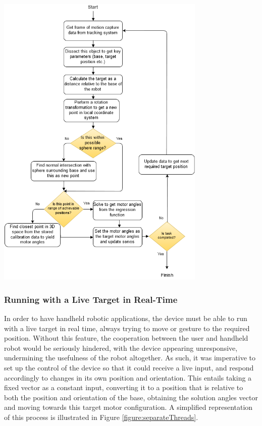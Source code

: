 \documentclass[11pt]{article}
\begin{document}
\begin{center}
\includegraphics[width=0.75\textwidth]{images/algorithmFlowDiagram.png}
\label{figure:getSolution}
\end{center}




\subsubsection{Running with a Live Target in Real-Time}
\label{section:liveTargetRealTime}

In order to have handheld robotic applications, the device must be able to run with a live target in real time, always trying to move or gesture to the required position. Without this feature, the cooperation between the user and handheld robot would be seriously hindered, with the device appearing unresponsive, undermining the usefulness of the robot altogether. As such, it was imperative to set up the control of the device so that it could receive a live input, and respond accordingly to changes in its own position and orientation. This entails taking a fixed vector as a constant input, converting it to a position that is relative to both the position and orientation of the base, obtaining the solution angles vector and moving towards this target motor configuration. A simplified representation of this process is illustrated in Figure \ref{figure:separateThreads}.
\end{document}
